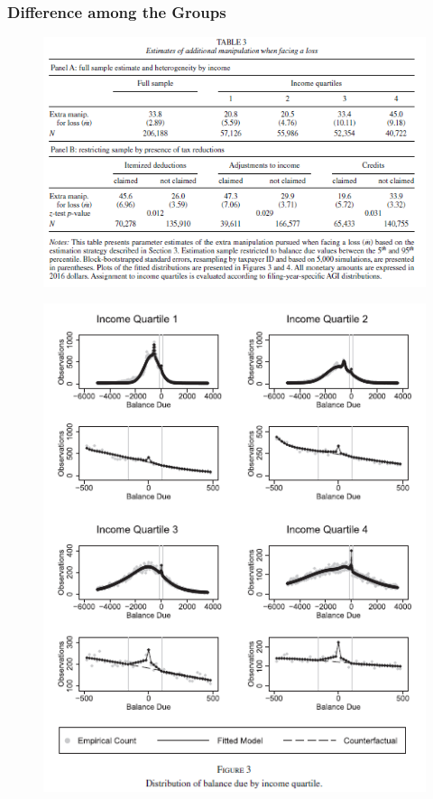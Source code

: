 \documentclass[dvipdfmx,12pt]{beamer}
\begin{document}
\begin{frame}\frametitle{Difference among the Groups}
  \begin{figure}[H]
    \includegraphics[keepaspectratio, scale=0.78]{fig_tab/ARJ_T3.png}
  \end{figure}
\end{frame}

\begin{frame}
  \begin{figure}
    \includegraphics[keepaspectratio, scale = 0.6]{fig_tab/ARJ_F3.png}
  \end{figure}
\end{frame}
\end{document}
